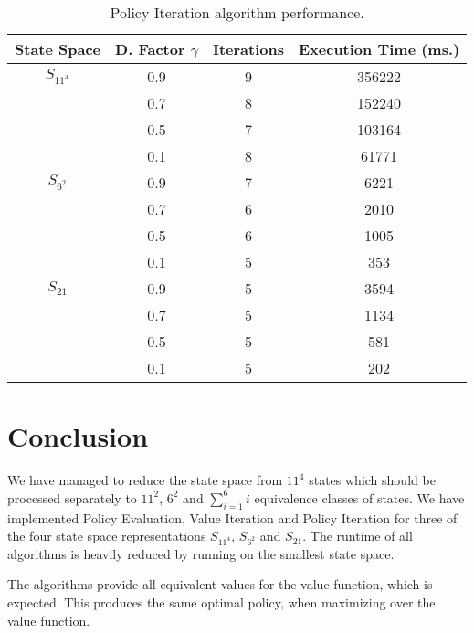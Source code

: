 \documentclass[a4paper,11pt]{article}
\newcommand{\SN}[0]{\ensuremath{S_{11^4}}}
\newcommand{\SSW}[0]{\ensuremath{S_{6^2}}}
\newcommand{\SRSW}[0]{\ensuremath{S_{21}}}
\begin{document}
\begin{table}
\caption{Policy Iteration algorithm performance.}
\label{tab:piap}
\begin{center}
\begin{tabular}{@{ }c@{ }@{ }c@{ }@{ }c@{ }@{ }c@{ }}
\textbf{State Space} & \textbf{D. Factor $\gamma$} & \textbf{Iterations}& \textbf{Execution Time (ms.)} \\
\midrule
$\SN$ & 0.9 & 9 & 356222 \\
     & 0.7 & 8 & 152240 \\
     & 0.5 & 7 & 103164 \\
     & 0.1 & 8 & 61771 \vspace{0.1cm}  \\
$\SSW$  & 0.9 & 7 & 6221 \\
     & 0.7 & 6 & 2010 \\
     & 0.5 & 6 & 1005 \\
     & 0.1 & 5 & 353 \vspace{0.1cm}  \\ 
$\SRSW$   & 0.9 & 5 & 3594 \\
     & 0.7 & 5 & 1134 \\
     & 0.5 & 5 & 581 \\
     & 0.1 & 5 & 202 \\      
\end{tabular}
\end{center}
\end{table}


\section*{Conclusion}
We have managed to reduce the state space from $11^4$ states which should be processed separately to $11^2$, $6^2$ and $\sum_{i=1}^6 i$ equivalence classes of states.  We have implemented Policy Evaluation, Value Iteration and Policy Iteration for three of the four state space representations $\SN$, $\SSW$ and $\SRSW$.  The runtime of all algorithms is heavily reduced by running on the smallest state space.

The algorithms provide all equivalent values for the value function, which is expected.  This produces the same optimal policy, when maximizing over the value function.
\end{document}
